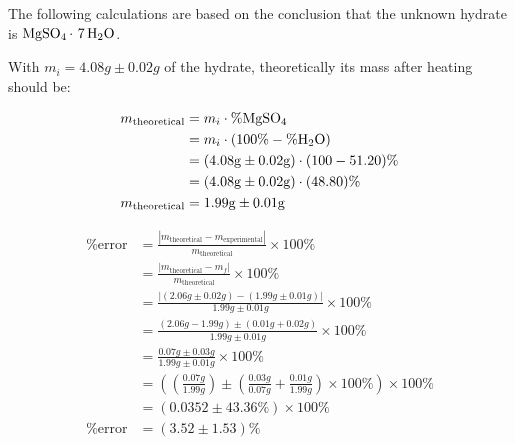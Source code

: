 \documentclass{article}
\begin{document}
The following calculations are based on the conclusion that the unknown hydrate is $\ce{MgSO4* 7H2O}$.

With $m_i = 4.08\si{g} \pm 0.02\si{g}$ of the hydrate, theoretically its mass after heating should be:

\begin{align*}
    m_{\text{theoretical}} & = m_i \cdot \%\ce{MgSO4}                            \\
                           & = m_i \cdot (100\% - \%\ce{H2O})                    \\
                           & = (4.08\si{g} \pm 0.02\si{g}) \cdot (100 - 51.20)\% \\
                           & = (4.08\si{g} \pm 0.02\si{g}) \cdot (48.80)\%       \\
    m_{\text{theoretical}} & = 1.99\si{g} \pm 0.01\si{g}
\end{align*}

\begin{align*}
    \%\text{error} & = \frac{|m_{\text{theoretical}} - m_{\text{experimental}}|}{m_{\text{theoretical}}} \times 100\%                                                                       \\[8pt]
                   & = \frac{|m_{\text{theoretical}} - m_f|}{m_{\text{theoretical}}} \times 100\%                                                                                           \\[8pt]
                   & = \frac{\left| (2.06\si{g} \pm 0.02\si{g}) - (1.99\si{g} \pm 0.01\si{g}) \right|}{1.99\si{g} \pm 0.01\si{g}} \times 100\%                                              \\[8pt]
                   & = \frac{(2.06\si{g} - 1.99\si{g}) \pm (0.01\si{g} + 0.02\si{g})}{1.99\si{g} \pm 0.01\si{g}} \times 100\%                                                               \\[8pt]
                   & = \frac{0.07\si{g} \pm 0.03\si{g}}{1.99\si{g} \pm 0.01\si{g}} \times 100\%                                                                                             \\[8pt]
                   & = \left( \left( \frac{0.07\si{g}}{1.99\si{g}} \right) \pm \left( \frac{0.03\si{g}}{0.07\si{g}} + \frac{0.01\si{g}}{1.99\si{g}} \right) \times100\% \right) \times 100\% \\[8pt]
                   & = (0.0352 \pm 43.36\%) \times 100\%                                                                                                                                    \\
    \%\text{error} & = (3.52 \pm 1.53)\%
\end{align*}
\end{document}
